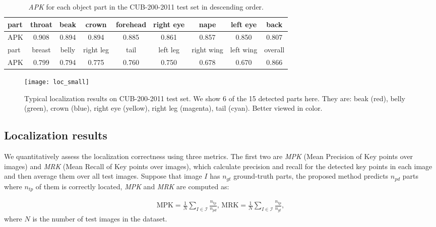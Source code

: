 \documentclass[10pt,twocolumn,letterpaper]{article}
\begin{document}
\begin{table*}[ht]
\small
\begin{center}
\begin{tabular}{l|c|c|c|c|c|c|c|c}
\hline
part & throat & beak & crown & forehead & right eye & nape & left eye & back\\
\hline
APK & 0.908 & 0.894 & 0.894 & 0.885 & 0.861 & 0.857 & 0.850 & 0.807\\
\hline\hline
part & breast & belly & right leg & tail & left leg & right wing & left wing & overall\\
\hline
APK & 0.799 & 0.794 & 0.775 & 0.760 & 0.750 & 0.678 & 0.670 & 0.866\\
\hline
\end{tabular}
\end{center}
\caption{\emph{APK} for each object part in the CUB-200-2011 test set in descending order.}
\label{tab:locapk}
\end{table*}

\begin{figure*}[t]
\begin{center}
\texttt{[image: loc\_small]}
\end{center}
   \caption{Typical localization results on CUB-200-2011 test set. We show 6 of the 15 detected parts here. They are: beak (red), belly (green), crown (blue), right eye (yellow), right leg (magenta), tail (cyan). Better viewed in color.}
\label{fig:loc}
\end{figure*}

\subsection{Localization results}
We quantitatively assess the localization correctness using three metrics. The first two are \emph{MPK} (Mean Precision of Key points over images) and \emph{MRK} (Mean Recall of Key points over images), which calculate precision and recall for the detected key points in each image and then average them over all test images. Suppose that image $I$ has $n_{gt}$ ground-truth parts, the proposed method predicts $n_{pd}$ parts where $n_{tp}$ of them is correctly located, \emph{MPK} and \emph{MRK} are computed as:

\begin{eqnarray}
\text{MPK} = \frac{1}{N}\sum_{I\in\mathcal{I}}\frac{n_{tp}}{n_{pd}} \text{,    MRK} = \frac{1}{N}\sum_{I\in\mathcal{I}}\frac{n_{tp}}{n_{gt}},
\end{eqnarray}
where $N$ is the number of test images in the dataset.
\end{document}
